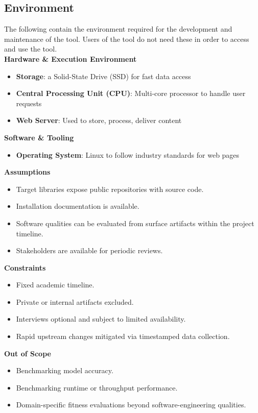 \documentclass{article}
\begin{document}
\subsection{Environment}
The following contain the environment required for the development and maintenance of the tool. Users of the tool do not need these in order to access and use the tool.
\\\textbf{Hardware \& Execution Environment}
\begin{itemize}
    \item \textbf{Storage}: a Solid-State Drive (SSD) for fast data access
    \item \textbf{Central Processing Unit (CPU)}: Multi-core processor to handle user requests
    \item \textbf{Web Server}: Used to store, process, deliver content
\end{itemize}
\textbf{Software \& Tooling}
\begin{itemize}
  \item \textbf{Operating System}: Linux to follow industry standards for web pages
\end{itemize}
\textbf{Assumptions}
\begin{itemize}
  \item Target libraries expose public repositories with source code.
  \item Installation documentation is available.
  \item Software qualities can be evaluated from surface artifacts within the project timeline.
  \item Stakeholders are available for periodic reviews.
\end{itemize}
\textbf{Constraints}
\begin{itemize}
  \item Fixed academic timeline.
  \item Private or internal artifacts excluded.
  \item Interviews optional and subject to limited availability.
  \item Rapid upstream changes mitigated via timestamped data collection.
\end{itemize}
\textbf{Out of Scope}
\begin{itemize}
  \item Benchmarking model accuracy.
  \item Benchmarking runtime or throughput performance.
  \item Domain-specific fitness evaluations beyond software-engineering qualities.
\end{itemize}
\end{document}

